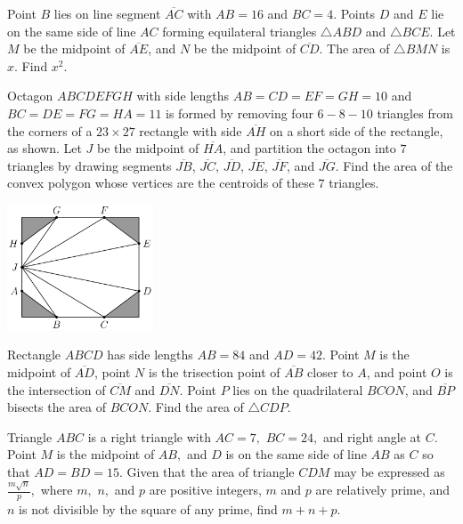 \documentclass[11pt]{scrartcl}
\begin{document}
\begin{problem}[AIME I 2015/4]
Point $B$ lies on line segment $\overline{AC}$ with $AB=16$ and $BC=4$. Points $D$ and $E$ lie on the same side of line $AC$ forming equilateral triangles $\triangle ABD$ and $\triangle BCE$. Let $M$ be the midpoint of $\overline{AE}$, and $N$ be the midpoint of $\overline{CD}$. The area of $\triangle BMN$ is $x$. Find $x^2$.
\end{problem}

\begin{problem}[AIME II 2018/9]
Octagon $ABCDEFGH$ with side lengths $AB = CD = EF = GH = 10$ and $BC=  DE = FG = HA = 11$ is formed by removing four $6-8-10$ triangles from the corners of a $23\times 27$ rectangle with side $\overline{AH}$ on a short side of the rectangle, as shown. Let $J$ be the midpoint of $\overline{HA}$, and partition the octagon into $7$ triangles by drawing segments $\overline{JB}$, $\overline{JC}$, $\overline{JD}$, $\overline{JE}$, $\overline{JF}$, and $\overline{JG}$. Find the area of the convex polygon whose vertices are the centroids of these $7$ triangles.
\begin{center}
\includegraphics[width = 0.325\textwidth]{aimeii20189.png}
\end{center}
\end{problem}

\begin{problem}[AIME II 2017/10]
Rectangle $ABCD$ has side lengths $AB=84$ and $AD=42$. Point $M$ is the midpoint of $\overline{AD}$, point $N$ is the trisection point of $\overline{AB}$ closer to $A$, and point $O$ is the intersection of $\overline{CM}$ and $\overline{DN}$. Point $P$ lies on the quadrilateral $BCON$, and $\overline{BP}$ bisects the area of $BCON$. Find the area of $\triangle CDP$.
\end{problem}

\begin{problem}[AIME II 2003/11]
Triangle $ABC$ is a right triangle with $AC=7,$ $BC=24,$ and right angle at $C.$ Point $M$ is the midpoint of $AB,$ and $D$ is on the same side of line $AB$ as $C$ so that $AD=BD=15.$ Given that the area of triangle $CDM$ may be expressed as $\frac{m\sqrt{n}}{p},$ where $m,$ $n,$ and $p$ are positive integers, $m$ and $p$ are relatively prime, and $n$ is not divisible by the square of any prime, find $m+n+p.$
\end{problem}
\end{document}

